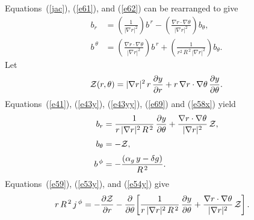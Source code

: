 \documentclass[12pt,prb,aps]{revtex4-1}
\begin{document}
Equations~(\ref{jac}), (\ref{e61}), and (\ref{e62}) can be rearranged to give\,\cite{tj}
\begin{align}
b_r &= \left(\frac{1}{|\nabla r|^2}\right)b^{\,r}- \left(\frac{\nabla r\cdot\nabla\theta}{|\nabla r|^2}\right)b_\theta,\label{e69}\\[0.5ex]
\label{e58x}
b^{\,\theta}& = \left(\frac{\nabla r\cdot\nabla\theta}{|\nabla r|^2}\right)b^{\,r} + \left(\frac{1}{r^2\,R^{\,2}\,|\nabla r|^2}\right) b_\theta.
\end{align}
Let 
\begin{equation}\label{zdef}
{\cal Z}(r,\theta)= |\nabla r|^2\,r\,\frac{\partial y}{\partial r} + r\,\nabla r\cdot\nabla\theta\,\frac{\partial y}{\partial\theta}.
\end{equation}
Equations~(\ref{e41}), (\ref{e43y}), (\ref{e43yy}), (\ref{e69}) and (\ref{e58x}) yield 
\begin{align}\label{e53y}
b_r &=\frac{1}{r\,|\nabla r|^2\,R^{\,2}}\,\frac{\partial y}{\partial \theta} + \frac{\nabla r\cdot\nabla\theta}{|\nabla r|^2}\,{\cal Z},\\[0.5ex]
b_\theta &= -{\cal Z},\label{e54y}\\[0.5ex]
b^{\,\phi} &= -\frac{(\alpha_g\,y-\delta g)}{R^{\,2}}.\label{e55yy}
\end{align}
Equations~(\ref{e59}), (\ref{e53y}), and (\ref{e54y}) give
\begin{align}\label{e56yy}
r\,R^{\,2}\,j^{\,\phi} &=-\frac{\partial {\cal Z}}{\partial r}-\frac{\partial}{\partial\theta}\!\left[\frac{1}{r\,|\nabla r|^2\,R^{\,2}}\,\frac{\partial y}{\partial \theta} + \frac{\nabla r\cdot\nabla\theta}{|\nabla r|^2}\,{\cal Z}\right].
\end{align}
\end{document}
